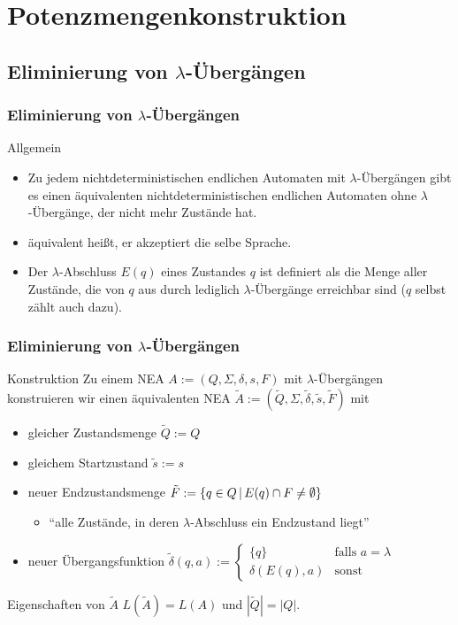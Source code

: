 \section{Potenzmengenkonstruktion}
\subsection{Eliminierung von $\lambda$-Übergängen}
\begin{frame}
	\frametitle{Eliminierung von $\lambda$-Übergängen}
	\begin{block}{Allgemein}
	\begin{itemize}
	 \item Zu jedem nichtdeterministischen endlichen Automaten mit $\lambda$-Übergängen gibt es einen äquivalenten nichtdeterministischen
	 endlichen Automaten ohne $\lambda$-Übergänge, der nicht mehr Zustände hat.
	 \item äquivalent heißt, er akzeptiert die selbe Sprache.
	\item Der $\lambda$-Abschluss $E(q)$ eines Zustandes $q$ ist definiert als die Menge aller Zustände, die von $q$ aus durch lediglich $\lambda$-Übergänge erreichbar sind ($q$ selbst zählt auch dazu).
	\end{itemize}
	\end{block}
\end{frame}
\begin{frame}
\frametitle{Eliminierung von $\lambda$-Übergängen}
	\begin{block}{Konstruktion}
	Zu einem NEA \(A := (Q, \Sigma, \delta, s, F)\) mit $\lambda$-Übergängen konstruieren wir einen 
	  äquivalenten NEA \(\tilde{A} := (\tilde{Q}, \Sigma, \tilde{\delta}, \tilde{s}, \tilde{F})\) mit
	 \begin{itemize}
	 \item gleicher Zustandsmenge \(\tilde{Q} := Q\)
	 \item gleichem Startzustand \(\tilde{s} := s\)
	 \item neuer Endzustandsmenge \(\tilde{F} := \left\lbrace q \in Q \,\middle\vert\, E(q)\cap F \neq \emptyset \right\rbrace\)
	 \begin{itemize}
	 	\item ``alle Zustände, in deren $\lambda$-Abschluss ein Endzustand liegt''
	 \end{itemize}
	 \item neuer Übergangsfunktion $\tilde{\delta}(q,a) := 
	 \begin{cases}
	  \{q\}			& \text{falls $a = \lambda$} \\
	 \delta(E(q),a)	& \text{sonst}
	 \end{cases}$
	 \end{itemize}
	\end{block}
	\begin{block}{Eigenschaften von \(\tilde{A}\)}
	 \(L(\tilde{A}) = L(A)\) und \(|\tilde{Q}| = |Q|\).
	\end{block}

\end{frame}

